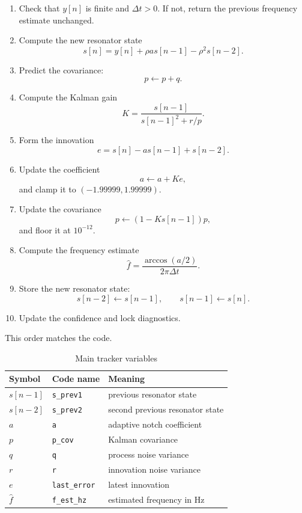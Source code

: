\documentclass[conference]{IEEEtran}
\begin{document}
    \begin{enumerate}[leftmargin=1.6em]
        \item Check that $y[n]$ is finite and $\Delta t > 0$. If not, return the
        previous frequency estimate unchanged.
        \item Compute the new resonator state
        \[
            s[n] = y[n] + \rho a s[n-1] - \rho^2 s[n-2].
        \]
        \item Predict the covariance:
        \[
            p \leftarrow p + q.
        \]
        \item Compute the Kalman gain
        \[
            K = \frac{s[n-1]}{s[n-1]^2 + r/p}.
        \]
        \item Form the innovation
        \[
            e = s[n] - a s[n-1] + s[n-2].
        \]
        \item Update the coefficient
        \[
            a \leftarrow a + K e,
        \]
        and clamp it to $(-1.99999,1.99999)$.
        \item Update the covariance
        \[
            p \leftarrow (1-Ks[n-1])p,
        \]
        and floor it at $10^{-12}$.
        \item Compute the frequency estimate
        \[
            \hat f = \frac{\arccos(a/2)}{2\pi\Delta t}.
        \]
        \item Store the new resonator state:
        \[
            s[n-2] \leftarrow s[n-1],\qquad
            s[n-1] \leftarrow s[n].
        \]
        \item Update the confidence and lock diagnostics.
    \end{enumerate}

    This order matches the code.

    \begin{table}[t]
        \centering
        \caption{Main tracker variables}
        \label{tab:vars}
        \small
        \begin{tabular}{@{}lll@{}}
            \toprule
            Symbol & Code name & Meaning \\
            \midrule
            $s[n-1]$ & \texttt{s\_prev1} & previous resonator state \\
            $s[n-2]$ & \texttt{s\_prev2} & second previous resonator state \\
            $a$ & \texttt{a} & adaptive notch coefficient \\
            $p$ & \texttt{p\_cov} & Kalman covariance \\
            $q$ & \texttt{q} & process noise variance \\
            $r$ & \texttt{r} & innovation noise variance \\
            $e$ & \texttt{last\_error} & latest innovation \\
            $\hat f$ & \texttt{f\_est\_hz} & estimated frequency in Hz \\
            \bottomrule
        \end{tabular}
    \end{table}
\end{document}
